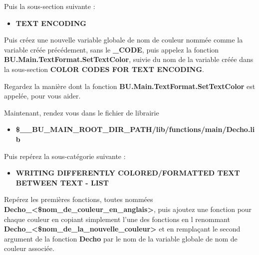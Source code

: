 \documentclass[a4paper,10pt]{article}
\begin{document}
    \begin{justify}
        Puis la sous-section suivante :

        \begin{itemize}
            \item \textbf{TEXT ENCODING}
        \end{itemize}
    \end{justify}


    \begin{justify}
        Puis créez une nouvelle variable globale de nom de couleur nommée comme la variable créée précédement, sans le \textbf{\color{vars}\_CODE}, puis appelez la fonction \textbf{\color{mauve}BU.Main.TextFormat.SetTextColor}, suivie du nom de la variable créée dans la sous-section \textbf{COLOR CODES FOR TEXT ENCODING}.
    \end{justify}

    \begin{justify}
        Regardez la manière dont la fonction \textbf{\color{mauve}BU.Main.TextFormat.SetTextColor} est appelée, pour vous aider.\\\mbox{}
    \end{justify}

    \begin{justify}
        Maintenant, rendez vous dans le fichier de librairie

        \begin{itemize}
            \item \textbf{\color{vars}\$\_\_BU\_MAIN\_ROOT\_DIR\_PATH\color{path}/lib/functions/main/Decho.lib}
        \end{itemize}
    \end{justify}

    \begin{justify}
        Puis repérez la sous-catégorie suivante :

        \begin{itemize}
            \item \textbf{WRITING DIFFERENTLY COLORED/FORMATTED TEXT BETWEEN TEXT - LIST}
        \end{itemize}
    \end{justify}

    \begin{justify}
        Repérez les premières fonctions, toutes nommées \textbf{\color{mauve}Decho\_<\$nom\_de\_couleur\_en\_anglais>}, puis ajoutez une fonction pour chaque couleur en copiant simplement l'une des fonctions en l renommant \textbf{\color{mauve}Decho\_<\$nom\_de\_la\_nouvelle\_couleur>} et en remplaçant le second argument de la fonction \textbf{\color{mauve}Decho} par le nom de la variable globale de nom de couleur associée.\\\mbox{}
    \end{justify}
\end{document}
